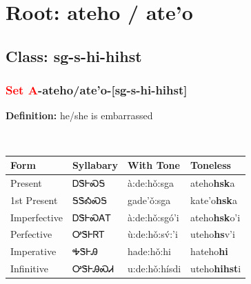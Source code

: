 \needspace{4in}
\section*{Root: ateho / ate'o}
\nopagebreak
{}
\needspace{3in}
\subsection*{Class: sg-s-hi-hihst}
\nopagebreak
\needspace{2in}
\subsubsection*{\textcolor{Red}{Set A}{-}\textbf{ateho/ate'o}{-}[sg-s-hi-hihst]}
\nopagebreak
\textbf{Definition: } he/she is embarrassed
\\[0.5em]
\begin{tabularx}{\textwidth}{l X X X}%
\toprule%
\textbf{Form}&\textbf{Syllabary}&\textbf{With Tone}&\textbf{Toneless}\\%
\midrule%
Present&ᎠᏕᎰᏍᎦ&à:de:hǒ:sga&ateho\textbf{hsk}a\\%
1st Present&ᎦᏕᎣᏍᎦ&gade’ǒ:sga&kate'o\textbf{hsk}a\\%
Imperfective&ᎠᏕᎰᏍᎪᎢ&à:de:hǒ:sgó’i&ateho\textbf{hsk}o'i\\%
Perfective&ᎤᏕᎰᏒᎢ&ù:de:hǒ:sv́:’i&uteho\textbf{hs}v'i\\%
Imperative&ᎭᏕᎰᎯ&hade:hǒ:hi&hateho\textbf{hi}\\%
Infinitive&ᎤᏕᎰᎯᏍᏗ&u:de:hǒ:hísdi&uteho\textbf{hihst}i\\%
\bottomrule%
\end{tabularx}
\\[1em]